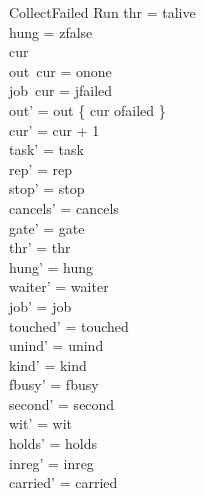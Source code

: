 \documentclass[a4paper,10pt,fleqn]{article}
\begin{document}
\begin{schema}{CollectFailed}
\Delta Run
\where
thr = talive \\
hung = zfalse \\
cur   \\
out~cur = onone \\
job~cur = jfailed \\
out' = out \oplus \{ cur \mapsto ofailed \} \\
cur' = cur + 1 \\
task' = task \\
rep' = rep \\
stop' = stop \\
cancels' = cancels \\
gate' = gate \\
thr' = thr \\
hung' = hung \\
waiter' = waiter \\
job' = job \\
touched' = touched \\
unind' = unind \\
kind' = kind \\
fbusy' = fbusy \\
second' = second \\
wit' = wit \\
holds' = holds \\
inreg' = inreg \\
carried' = carried
\end{schema}
\end{document}

